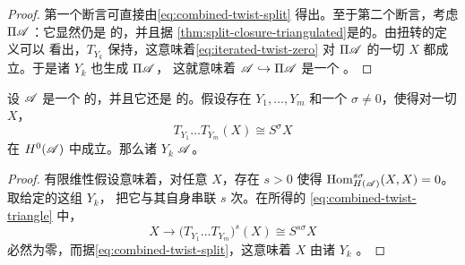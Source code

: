 \begin{proof}
第一个断言可直接由\eqref{eq:combined-twist-split} 得出。至于第二个断言，考虑%
\trSplitClosure{} $\Pi\mathscr{A}$：它显然仍是 \trCfinite{}的，并且据%
\cref{thm:split-closure-triangulated}是\trTriangulated{}的。由扭转的定义可以
看出，$T_{Y_k}$ 保持\trDirectSum，这意味着\eqref{eq:iterated-twist-zero} 对
$\Pi\mathscr{A}$ 的一切\trObject{} $X$ 都成立。于是诸 $Y_k$ 也生成 $\Pi\mathscr{A}$，
这就意味着\trEmbedding{} $\mathscr{A}\hookrightarrow\Pi\mathscr{A}$ 是一个%
\trQuasiequivalence。
\end{proof}

\begin{corollary}\label{thm:shifted-twist-split-generates}
设 $\mathscr{A}$ 是一个 \trCfinite{}的\trTriangulated{}\trACategory，并且它还是%
\trSplitClosed{}的。假设存在 $Y_1,\ldots,Y_m$ 和一个 $\sigma\neq 0$，使得对一切
$X$，
\begin{equation*}
T_{Y_1}\ldots T_{Y_m}(X)\cong S^{\sigma}X
\end{equation*}
在 $H^0(\mathscr{A})$ 中成立。那么诸 $Y_k$ \trSplitGeneration{} $\mathscr{A}$。
\end{corollary}

\begin{proof}
有限维性假设意味着，对任意 $X$，存在 $s>0$ 使得
$\mathrm{Hom}^{s\sigma}_{H(\mathscr{A})}(X,X)=0$。取给定的这组\trObject{} $Y_k$，
把它与其自身串联 $s$ 次。在所得的\trExactTriangle{}
\eqref{eq:combined-twist-triangle} 中，\trMorphism
\begin{equation*}
X\longrightarrow\bigl(T_{Y_1}\ldots T_{Y_m}\bigr)^s(X)\cong S^{s\sigma}X
\end{equation*}
必然为零，而据\eqref{eq:combined-twist-split}，这意味着 $X$ 由诸 $Y_k$
\trSplitGeneration。
\end{proof}
